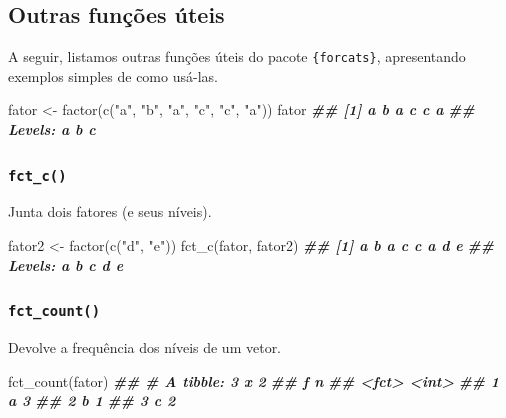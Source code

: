\documentclass[
]{book}
\newenvironment{Shaded}{\begin{snugshade}}{\end{snugshade}}
\newcommand{\DocumentationTok}[1]{\textcolor[rgb]{0.56,0.35,0.01}{\textbf{\textit{#1}}}}
\newcommand{\FunctionTok}[1]{\textcolor[rgb]{0.00,0.00,0.00}{#1}}
\newcommand{\NormalTok}[1]{#1}
\newcommand{\OtherTok}[1]{\textcolor[rgb]{0.56,0.35,0.01}{#1}}
\newcommand{\StringTok}[1]{\textcolor[rgb]{0.31,0.60,0.02}{#1}}
\begin{document}
\hypertarget{outras-funuxe7uxf5es-uxfateis}{%
\subsection{Outras funções úteis}\label{outras-funuxe7uxf5es-uxfateis}}

A seguir, listamos outras funções úteis do pacote \texttt{\{forcats\}}, apresentando exemplos simples de como usá-las.

\begin{Shaded}
\begin{Highlighting}[]
\NormalTok{fator }\OtherTok{\textless{}{-}} \FunctionTok{factor}\NormalTok{(}\FunctionTok{c}\NormalTok{(}\StringTok{"a"}\NormalTok{, }\StringTok{"b"}\NormalTok{, }\StringTok{"a"}\NormalTok{, }\StringTok{"c"}\NormalTok{, }\StringTok{"c"}\NormalTok{, }\StringTok{"a"}\NormalTok{))}
\NormalTok{fator}
\DocumentationTok{\#\# [1] a b a c c a}
\DocumentationTok{\#\# Levels: a b c}
\end{Highlighting}
\end{Shaded}

\hypertarget{fct_c}{%
\subsubsection*{\texorpdfstring{\texttt{fct\_c()}}{fct\_c()}}\label{fct_c}}

Junta dois fatores (e seus níveis).

\begin{Shaded}
\begin{Highlighting}[]
\NormalTok{fator2 }\OtherTok{\textless{}{-}} \FunctionTok{factor}\NormalTok{(}\FunctionTok{c}\NormalTok{(}\StringTok{"d"}\NormalTok{, }\StringTok{"e"}\NormalTok{))}
\FunctionTok{fct\_c}\NormalTok{(fator, fator2)}
\DocumentationTok{\#\# [1] a b a c c a d e}
\DocumentationTok{\#\# Levels: a b c d e}
\end{Highlighting}
\end{Shaded}

\hypertarget{fct_count}{%
\subsubsection*{\texorpdfstring{\texttt{fct\_count()}}{fct\_count()}}\label{fct_count}}

Devolve a frequência dos níveis de um vetor.

\begin{Shaded}
\begin{Highlighting}[]
\FunctionTok{fct\_count}\NormalTok{(fator)}
\DocumentationTok{\#\# \# A tibble: 3 x 2}
\DocumentationTok{\#\#   f         n}
\DocumentationTok{\#\#   \textless{}fct\textgreater{} \textless{}int\textgreater{}}
\DocumentationTok{\#\# 1 a         3}
\DocumentationTok{\#\# 2 b         1}
\DocumentationTok{\#\# 3 c         2}
\end{Highlighting}
\end{Shaded}
\end{document}
